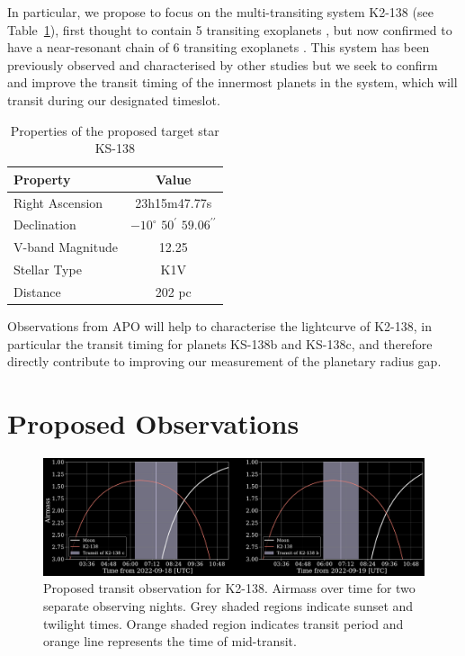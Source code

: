 \documentclass[twocolumn]{aastex631}
\begin{document}
In particular, we propose to focus on the multi-transiting system K2-138 (see Table~\ref{tab:star}), first thought to contain 5 transiting exoplanets \cite{Christiansen+2018}, but now confirmed to have a near-resonant chain of 6 transiting exoplanets \citep{Hardegree-Ullman+2021}. This system has been previously observed and characterised by other studies \cite{Lopez+2019, Acuna+2022} but we seek to confirm and improve the transit timing of the innermost planets in the system, which will transit during our designated timeslot.

\begin{table}[htb]
    \centering
    \begin{tabular}{l|c} 
        \hline
        Property & Value \\
        \hline\hline
        Right Ascension & 23h15m47.77s \\
        Declination & $-10^\circ$ $50^\prime$ $59.06^{\prime\prime}$ \\
        V-band Magnitude & 12.25 \\
        Stellar Type & K1V \\
        Distance & 202 pc \\
        \hline
    \end{tabular}
    \caption{Properties of the proposed target star KS-138}
    \label{tab:star}
\end{table}

Observations from APO will help to characterise the lightcurve of K2-138, in particular the transit timing for planets KS-138b and KS-138c, and therefore directly contribute to improving our measurement of the planetary radius gap.

\section{Proposed Observations}
\begin{figure}[htb]
    \includegraphics[width=\columnwidth]{observable_transits.pdf}
    \caption{Proposed transit observation for K2-138. Airmass over time for two separate observing nights. Grey shaded regions indicate sunset and twilight times. Orange shaded region indicates transit period and orange line represents the time of mid-transit.}
\end{figure}
\end{document}
